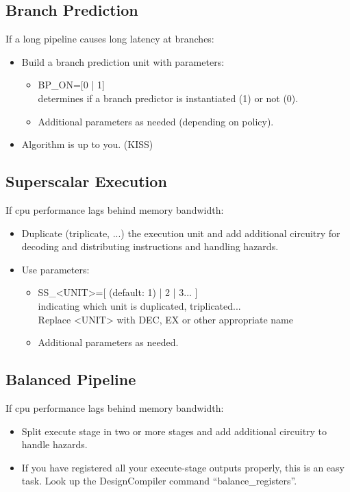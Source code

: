 \subsection{Branch Prediction}		 
If a long pipeline causes long latency at branches:
\begin{itemize}
\item Build a branch prediction unit with parameters:
\begin{itemize}
\item	BP\_ON=[0 | 1]\\
		determines if a branch predictor is instantiated (1) or not (0).
\item	Additional parameters as needed (depending on policy).
\end{itemize} 
\item Algorithm is up to you. (KISS)
\end{itemize}

\subsection{Superscalar Execution}
If cpu performance lags behind memory bandwidth:
\begin{itemize}
\item Duplicate (triplicate, ...) the execution unit and add additional circuitry for decoding and distributing instructions and handling hazards.
\item Use parameters:
\begin{itemize}
\item	SS\_<UNIT>=[ (default: 1) | 2 | 3... ]\\
		indicating which unit is duplicated, triplicated...\\
		Replace <UNIT> with DEC, EX or other appropriate name
\item	Additional parameters as needed.
\end{itemize} 
\end{itemize}

\subsection{Balanced Pipeline}
If cpu performance lags behind memory bandwidth:
\begin{itemize}
	\item Split execute stage in two or more stages and add additional circuitry to handle hazards.
	\item If you have registered all your execute-stage outputs properly, this is an easy task. Look up the DesignCompiler command ``balance\_registers''.
\end{itemize}